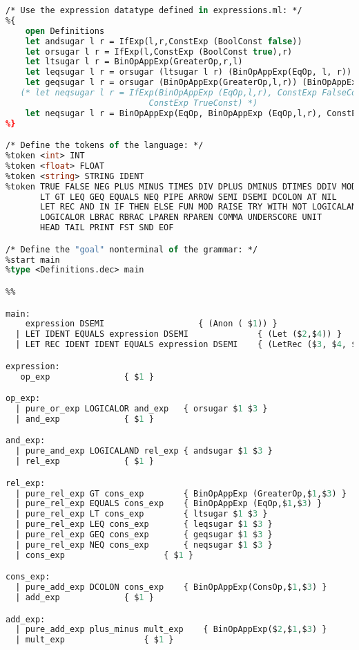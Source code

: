 \begin{lstlisting}[language=Caml, caption=tailRecPicoMLparse.mly]
/* Use the expression datatype defined in expressions.ml: */
%{
    open Definitions
    let andsugar l r = IfExp(l,r,ConstExp (BoolConst false))
    let orsugar l r = IfExp(l,ConstExp (BoolConst true),r)
    let ltsugar l r = BinOpAppExp(GreaterOp,r,l)
    let leqsugar l r = orsugar (ltsugar l r) (BinOpAppExp(EqOp, l, r))
    let geqsugar l r = orsugar (BinOpAppExp(GreaterOp,l,r)) (BinOpAppExp(EqOp, l, r))
   (* let neqsugar l r = IfExp(BinOpAppExp (EqOp,l,r), ConstExp FalseConst,
    		       			 ConstExp TrueConst) *)
    let neqsugar l r = BinOpAppExp(EqOp, BinOpAppExp (EqOp,l,r), ConstExp (BoolConst false))
%}

/* Define the tokens of the language: */
%token <int> INT
%token <float> FLOAT
%token <string> STRING IDENT
%token TRUE FALSE NEG PLUS MINUS TIMES DIV DPLUS DMINUS DTIMES DDIV MOD EXP CARAT
       LT GT LEQ GEQ EQUALS NEQ PIPE ARROW SEMI DSEMI DCOLON AT NIL
       LET REC AND IN IF THEN ELSE FUN MOD RAISE TRY WITH NOT LOGICALAND
       LOGICALOR LBRAC RBRAC LPAREN RPAREN COMMA UNDERSCORE UNIT
       HEAD TAIL PRINT FST SND EOF

/* Define the "goal" nonterminal of the grammar: */
%start main
%type <Definitions.dec> main

%%

main:
    expression DSEMI      			   { (Anon ( $1)) }
  | LET IDENT EQUALS expression	DSEMI 	           { (Let ($2,$4)) }
  | LET REC IDENT IDENT EQUALS expression DSEMI    { (LetRec ($3, $4, $6)) }

expression:
   op_exp				{ $1 }

op_exp:
  | pure_or_exp LOGICALOR and_exp	{ orsugar $1 $3 }
  | and_exp				{ $1 }

and_exp:
  | pure_and_exp LOGICALAND rel_exp	{ andsugar $1 $3 }
  | rel_exp				{ $1 }

rel_exp:
  | pure_rel_exp GT cons_exp		{ BinOpAppExp (GreaterOp,$1,$3) }
  | pure_rel_exp EQUALS cons_exp	{ BinOpAppExp (EqOp,$1,$3) }
  | pure_rel_exp LT cons_exp		{ ltsugar $1 $3 }
  | pure_rel_exp LEQ cons_exp		{ leqsugar $1 $3 }
  | pure_rel_exp GEQ cons_exp		{ geqsugar $1 $3 }
  | pure_rel_exp NEQ cons_exp		{ neqsugar $1 $3 }
  | cons_exp	     			{ $1 }

cons_exp:
  | pure_add_exp DCOLON cons_exp	{ BinOpAppExp(ConsOp,$1,$3) }
  | add_exp				{ $1 }

add_exp:
  | pure_add_exp plus_minus mult_exp	{ BinOpAppExp($2,$1,$3) }
  | mult_exp				{ $1 }


\end{lstlisting}
